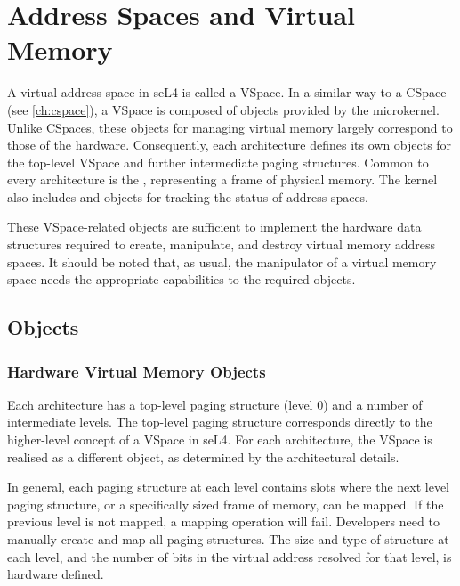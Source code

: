 %
%
%

\chapter{\label{ch:vspace}Address Spaces and Virtual Memory}

A virtual address space in seL4 is called a VSpace. In a similar
way to a CSpace (see \autoref{ch:cspace}), a VSpace is composed of objects
provided by the microkernel. Unlike CSpaces, these objects for managing
virtual memory largely correspond to those of the hardware. Consequently,
each architecture defines its own objects for the top-level VSpace and further intermediate paging structures.
Common to every architecture is the , representing a frame of physical memory.
The kernel also includes  and
 objects for tracking the status of address spaces.

These VSpace-related objects are sufficient to implement the
hardware data structures required to create, manipulate, and destroy
virtual memory address spaces. It should be noted that, as usual, the
manipulator of a virtual memory space needs the appropriate
capabilities to the required objects.

\section{Objects}

\subsection{Hardware Virtual Memory Objects}

Each architecture has a top-level paging structure (level 0) and a number of intermediate levels.
The top-level paging structure corresponds directly to the higher-level concept of a VSpace in seL4.
For each architecture, the VSpace is realised as a different object, as determined by the
architectural details.

In general, each paging structure at each level contains slots where the next level paging structure,
or a specifically sized frame of memory, can be mapped. If the previous level is not mapped,
a mapping operation will fail. Developers need to manually create and map all paging structures.
The size and type of structure at each level, and the number of bits in the virtual address resolved
for that level, is hardware defined.

